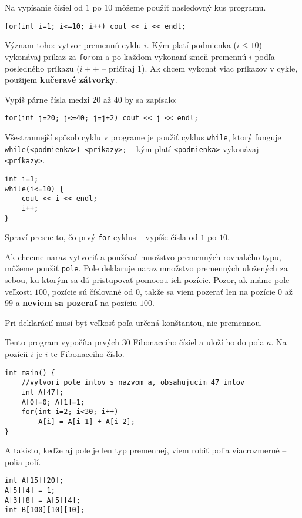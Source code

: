 Na vypísanie čísiel od $1$ po $10$ môžeme použiť nasledovný kus programu.

\begin{lstlisting}
for(int i=1; i<=10; i++) cout << i << endl;
\end{lstlisting}

Význam toho: vytvor premennú cyklu $i$. Kým platí podmienka ($i\leq10$) vykonávaj príkaz za
\texttt{for}om a po každom vykonaní zmeň premennú $i$ podľa posledného príkazu ($i++$ -- pričítaj
$1$). Ak chcem vykonať viac príkazov v cykle, použijem \textbf{kučeravé zátvorky}.

Vypíš párne čísla medzi $20$ až $40$ by sa zapísalo:
\begin{lstlisting}
for(int j=20; j<=40; j=j+2) cout << j << endl;
\end{lstlisting}

Všestrannejší spôsob cyklu v programe je použiť cyklus \texttt{while}, ktorý funguje
\texttt{while(<podmienka>) {<príkazy>};} --  kým platí \texttt{<podmienka>} vykonávaj
\texttt{<príkazy>}.

\begin{lstlisting}
int i=1;
while(i<=10) {
    cout << i << endl;
    i++;
}
\end{lstlisting}

Spraví presne to, čo prvý \texttt{for} cyklus -- vypíše čísla od $1$ po $10$.


Ak chceme naraz vytvoriť a používať množstvo premenných rovnakého typu, môžeme použiť \texttt{pole}.
Pole deklaruje naraz množstvo premenných uložených za sebou, ku ktorým sa dá pristupovať pomocou ich
pozície. Pozor, ak máme pole veľkosti $100$, pozície sú číslované od $0$, takže sa viem pozerať len
na pozície $0$ až $99$ a \textbf{neviem sa pozerať} na pozíciu $100$.

Pri deklarácií musí byť veľkosť poľa určená konštantou, nie premennou.

Tento program vypočíta prvých $30$ Fibonacciho čísiel a uloží ho do pola $a$. Na pozícii $i$ je
$i$-te Fibonacciho číslo.

\begin{lstlisting}
int main() {
    //vytvori pole intov s nazvom a, obsahujucim 47 intov
    int A[47];
    A[0]=0; A[1]=1;
    for(int i=2; i<30; i++)
        A[i] = A[i-1] + A[i-2];
}
\end{lstlisting}

A takisto, keďže aj pole je len typ premennej, viem robiť polia viacrozmerné -- polia polí.

\begin{lstlisting}
int A[15][20];
A[5][4] = 1;
A[3][8] = A[5][4];
int B[100][10][10];
\end{lstlisting}


